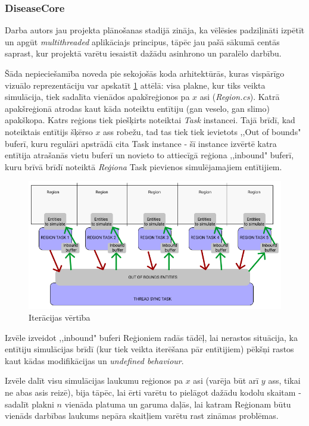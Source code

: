 \subsubsection{DiseaseCore}

Darba autors jau projekta plānošanas stadijā zināja, ka vēlēsies padziļināti
izpētīt un apgūt \emph{multithreaded} aplikāciajs principus, tāpēc jau pašā sākumā
centās saprast, kur projektā varētu iesaistīt dažādu asinhrono un paralēlo darbību.

Šāda nepieciešamība noveda pie sekojošās koda arhitektūrās, kuras vispārīgo
vizuālo reprezentāciju var apskatīt \ref{img:multithreaded-layout} attēlā: visa plakne, kur tiks
veikta simulācija, tiek sadalīta vienādos apakšreģionos pa \(x\) asi (\emph{Region.cs}).
Katrā apakšreģionā atrodas kaut kāda noteiktu entītiju (gan veselo, gan slimo) apakškopa.
Katrs reģions tiek piešķirts noteiktai \emph{Task}\cite{csharp:task} instancei.
Tajā brīdī, kad noteiktais entītijs šķērso \(x\) ass robežu, tad tas tiek tiek
ievietots ,,Out of bounds" buferī, kuru regulāri apstrādā cita Task instance - šī instance
izvērtē katra entītija atrašanās vietu buferī un novieto to attiecīgā reģiona
,,inbound" buferī, kuru brīvā brīdī noteiktā \emph{Reģiona} Task pievienos
simulējamajiem entītijiem.


\begin{figure}[H]
	\centering
	\includegraphics[scale=0.7]{images/multithreaded-layout.png}
	\caption{Iterācijas vērtība}
	\label{img:multithreaded-layout}
\end{figure}


Izvēle izveidot ,,inbound" buferi Reģioniem radās tādēļ, lai nerastos situācija,
ka entītiju simulācijas brīdī (kur tiek veikta iterēšana pār entītijiem) pēkšņi
rastos kaut kādas modifikācijas un \emph{undefined behaviour}.

Izvēle dalīt visu simulācijas laukumu reģionos pa \(x\) asi (varēja būt arī \(y\)
ass, tikai ne abas asis reizē), bija tāpēc, lai ērti varētu to pielāgot dažādu
kodolu skaitam -  sadalīt plakni \(n\) vienāda platuma un garuma daļās, lai
katram Reģionam būtu vienāds darbības laukums nepāra skaitļiem varētu rast zināmas problēmas.

